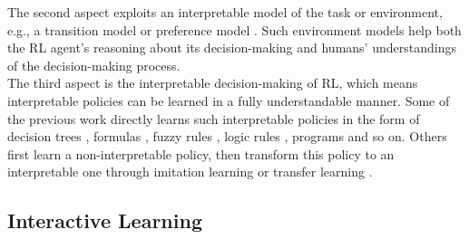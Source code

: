 \documentclass[twoside,11pt]{article}
\begin{document}
The second aspect exploits an interpretable model of the task or environment, e.g., a transition model \citep{martinez2016learning,zhu2020object} or preference model \citep{toro2019learning,icarte2018using}. Such environment models help both the RL agent's reasoning about its decision-making and humans' understandings of the decision-making process.\\

The third aspect is the interpretable decision-making of RL, which means interpretable policies can be learned in a fully understandable manner. Some of the previous work directly learns such interpretable policies in the form of decision trees \citep{likmeta2020combining,silva2020optimization,topin2021iterative}, formulas \citep{hein2018interpretable,hein2019generating}, fuzzy rules \citep{zhang2021kogun,akrour2019towards,hein2017particle}, logic rules \citep{jiang2019neural}, programs \citep{verma2019imitation,sun2019program} and so on. Others first learn a non-interpretable policy, then transform this policy to an interpretable one through imitation learning or transfer learning \citep{VermaEtAl:2018:ProgrammaticallyInterpretableRL,bastani2018verifiable}.\\



\subsection{Interactive Learning}

\end{document}
